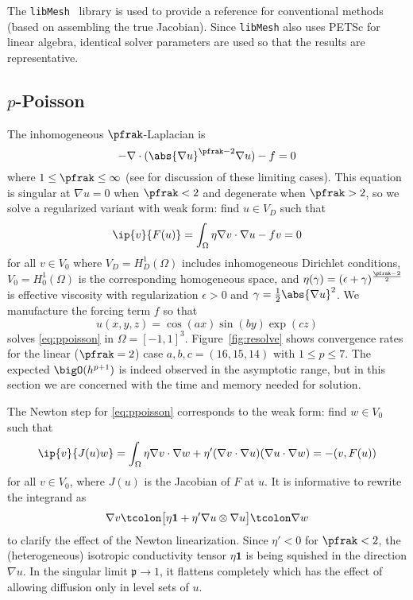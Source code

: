 The \texttt{libMesh}~\citep{libmesh} library is used to provide a reference for conventional methods (based on assembling
the true Jacobian).  Since \texttt{libMesh} also uses PETSc for linear algebra, identical solver parameters are used so
that the results are representative.

\subsection{$p$-Poisson}\label{sec:ppoisson}
The inhomogeneous $\pfrak$-Laplacian is
\begin{equation*}
  -\nabla \cdot (\abs{\nabla u}^{\pfrak-2} \nabla u) - f = 0
\end{equation*}
where $1 \le \pfrak \le \infty$ (see \citet{evans2007lol} for discussion of these limiting cases).  This equation is
singular at $\nabla u = 0$ when $\pfrak<2$ and degenerate when $\pfrak>2$, so we solve a regularized variant with weak
form: find $u \in V_D$ such that
\begin{equation}\label{eq:ppoisson}
  \ip{v}{F(u)} = \int_\Omega \eta \nabla v \cdot \nabla u - f v = 0
\end{equation}
for all $v \in V_0$ where $V_D = H^1_D(\Omega)$ includes inhomogeneous Dirichlet conditions, $V_0 = H^1_0(\Omega)$ is
the corresponding homogeneous space, and $\eta(\gamma) = ( \epsilon + \gamma )^{\frac{\pfrak-2}{2}}$ is effective
viscosity with regularization $\epsilon > 0$ and $\gamma = \frac 1 2 \abs{\nabla u}^2 $.  We manufacture the forcing
term $f$ so that
\[ u(x,y,z) = \cos(ax) \sin(by) \exp(cz) \] solves \eqref{eq:ppoisson} in $\Omega = [-1,1]^3$.  Figure~\ref{fig:resolve}
shows convergence rates for the linear ($\pfrak = 2$) case $a,b,c=(16,15,14)$ with $1 \le p \le 7$.  The expected
$\bigO(h^{p+1})$ is indeed observed in the asymptotic range, but in this section we are concerned with the time and
memory needed for solution.

The Newton step for \eqref{eq:ppoisson} corresponds to the weak form: find $w \in V_0$ such that
\begin{equation*}
  \ip{v}{J(u) w} = \int_\Omega \eta \nabla v \cdot\nabla w + \eta' (\nabla v\cdot\nabla u)(\nabla u\cdot\nabla w) = - (v,F(u))
\end{equation*}
for all $v \in V_0$, where $J(u)$ is the Jacobian of $F$ at $u$.  It is informative to rewrite the integrand as
\begin{equation*}
  \nabla v \tcolon \big[\eta\bm 1 + \eta' \nabla u \otimes \nabla u\big] \tcolon \nabla w
\end{equation*}
to clarify the effect of the Newton linearization.  Since $\eta' < 0$ for $\pfrak < 2$, the (heterogeneous) isotropic
conductivity tensor $\eta\bm 1$ is being squished in the direction $\nabla u$.  In the singular limit $\mathfrak p \to
1$, it flattens completely which has the effect of allowing diffusion only in level sets of $u$.

